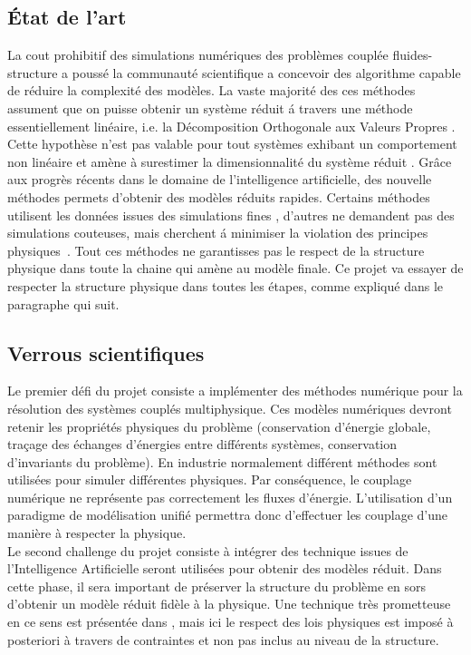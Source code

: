 \documentclass[french]{article}
\begin{document}
\subsection{État de l'art}
La cout prohibitif des simulations numériques des problèmes couplée fluides-structure a poussé la communauté scientifique a concevoir des algorithme capable de réduire la complexité des modèles. La vaste majorité des ces méthodes assument que on puisse obtenir un système réduit \'a travers une méthode essentiellement linéaire, i.e. la Décomposition Orthogonale aux Valeurs Propres \cite{shinde2019,tello2020fluid}. Cette hypothèse n'est pas valable pour tout systèmes exhibant un comportement non linéaire et amène à surestimer la dimensionnalité du système réduit \cite{kerschen2005}. Grâce aux progrès récents dans le domaine de l'intelligence artificielle, des nouvelle méthodes permets d'obtenir des modèles réduits rapides. Certains méthodes utilisent les données issues des simulations fines \cite{lee2020}, d'autres ne demandent pas des simulations couteuses, mais cherchent \'a minimiser la violation des principes physiques~\cite{sun2020physics}.  
Tout ces méthodes ne garantisses pas le respect de la structure physique dans toute la chaine qui amène au modèle finale. Ce projet va essayer de respecter la structure physique dans toutes les étapes, comme expliqué dans le paragraphe qui suit.


\subsection{Verrous scientifiques}


Le premier défi du projet consiste a implémenter des méthodes numérique pour la résolution des systèmes couplés multiphysique. Ces modèles numériques devront retenir les propriétés physiques du problème (conservation d'énergie globale, traçage des échanges d'énergies entre différents systèmes, conservation d'invariants du problème). En industrie normalement différent méthodes sont utilisées pour simuler différentes physiques. Par conséquence, le couplage numérique ne représente pas correctement les fluxes d'énergie. L'utilisation d'un paradigme de modélisation unifié permettra donc d'effectuer les couplage d'une manière à respecter la physique. \\

Le second challenge du projet consiste à intégrer des technique issues de l'Intelligence Artificielle seront utilisées pour obtenir des modèles réduit. Dans cette phase, il sera important de préserver la structure du problème en sors d'obtenir un modèle réduit fidèle à la physique. Une technique très prometteuse en ce sens est présentée dans \cite{lee2020}, mais ici le respect des lois physiques est imposé à posteriori à travers de contraintes et non pas inclus au niveau de la structure.
\end{document}

